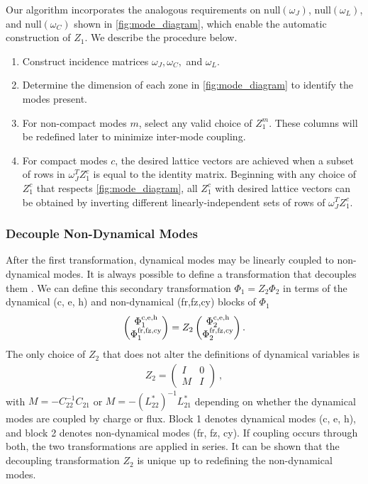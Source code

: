 Our algorithm incorporates the analogous requirements on $\textrm{null}(\omega_J)$, $\textrm{null}(\omega_L)$, and $\textrm{null}(\omega_C)$ shown in \cref{fig:mode_diagram}, which enable the automatic construction of $Z_1$. We describe the procedure below.
\begin{enumerate}
    \item[(1)] Construct incidence matrices $\omega_J, \omega_C, $ and $\omega_L$.
    \item[(2)] Determine the dimension of each zone in \cref{fig:mode_diagram} to identify the modes present.
    \item[(3)] For non-compact modes $m$, select any valid choice of $Z_1^m$. These columns will be redefined later to minimize inter-mode coupling.
    \item[(4)] For compact modes $c$, the desired lattice vectors are achieved when a subset of rows in $\omega_J^TZ_1^c$ is equal to the identity matrix. Beginning with any choice of $Z_1^c$ that respects \cref{fig:mode_diagram}, all $Z_1^c$ with desired lattice vectors can be obtained by inverting different linearly-independent sets of rows of $\omega_J^TZ_1^c$.
\end{enumerate}

\subsubsection{Decouple Non-Dynamical Modes} \label{app:var_trans:decouple}
After the first transformation, dynamical modes may be linearly coupled to non-dynamical modes. It is always possible to define a transformation that decouples them \cite{ding_free-mode_2021}. We can define this secondary transformation $\Phi_1 = Z_2\Phi_2$ in terms of the dynamical (c, e, h) and non-dynamical (fr,fz,cy) blocks of $\Phi_1$
\begin{align}
    \begin{pmatrix}
        \Phi_1^{\rm c,e,h} \\ \Phi_1^{\rm fr,fz,cy}
    \end{pmatrix} = Z_2 \begin{pmatrix}
        \Phi_2^{\rm c,e,h} \\ \Phi_2^{\rm fr,fz,cy}
    \end{pmatrix}.
\end{align}
The only choice of $Z_2$ that does not alter the definitions of dynamical variables is 
\begin{align}
    Z_2 = \begin{pmatrix}
    I & 0 \\
    M & I
\end{pmatrix} ~,
\end{align}
with $M= -C_{22}^{-1}C_{21}$ or $M = -(L^*_{22})^{-1}L^{*}_{21}$ depending on whether the dynamical modes are coupled by charge or flux. Block 1 denotes dynamical modes (c, e, h), and block 2 denotes non-dynamical modes (fr, fz, cy). If coupling occurs through both, the two transformations are applied in series. It can be shown that the decoupling transformation $Z_2$ is unique up to redefining the non-dynamical modes. 

